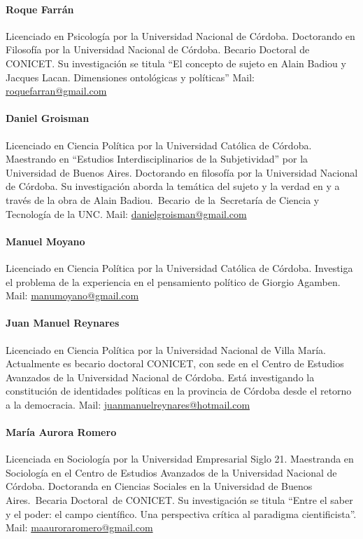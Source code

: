 \paragraph{Roque Farrán} Licenciado en Psicología por la Universidad Nacional de Córdoba.
Doctorando en Filosofía por la Universidad Nacional de Córdoba. Becario
Doctoral de CONICET. Su investigación se titula \enquote{El concepto de sujeto
	en Alain Badiou y Jacques Lacan. Dimensiones ontológicas y políticas} Mail: \url{roquefarran@gmail.com}

\paragraph{Daniel Groisman} Licenciado en Ciencia Política por la Universidad Católica de Córdoba.
Maestrando en \enquote{Estudios Interdisciplinarios de la Subjetividad} por la
Universidad de Buenos Aires. Doctorando en filosofía por la Universidad
Nacional de Córdoba. Su investigación aborda la temática del sujeto y la
verdad en y a través de la obra de Alain Badiou.~Becario~de
la~Secretaría de Ciencia y Tecnología de la UNC. Mail: \url{danielgroisman@gmail.com}

\paragraph{Manuel Moyano} Licenciado en Ciencia Política por la Universidad Católica de Córdoba.
Investiga el problema de la experiencia en el pensamiento político de
Giorgio Agamben. Mail: \url{manumoyano@gmail.com}

\paragraph{Juan Manuel Reynares} Licenciado en Ciencia Política por la Universidad Nacional de Villa
María. Actualmente es becario doctoral CONICET, con sede en el Centro de
Estudios Avanzados de la Universidad Nacional de Córdoba. Está
investigando la constitución de identidades políticas en la provincia de
Córdoba desde el retorno a la democracia. Mail: \url{juanmanuelreynares@hotmail.com}

\paragraph{María Aurora Romero} Licenciada en Sociología por la Universidad Empresarial Siglo 21.
Maestranda en Sociología en el Centro de Estudios Avanzados de la
Universidad Nacional de Córdoba. Doctoranda en Ciencias Sociales en la
Universidad de Buenos Aires.~Becaria Doctoral~de CONICET. Su
investigación se titula \enquote{Entre el saber y el poder: el campo científico.
	Una perspectiva crítica al paradigma cientificista}. Mail: \url{maauroraromero@gmail.com}

